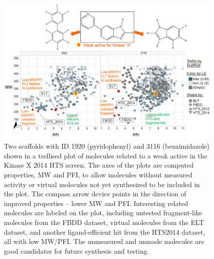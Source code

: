 \documentclass[journal=jacsat,biochem,manuscript=article]{achemso}
\begin{document}
\begin{figure}
\includegraphics[width=6in]{fig/KinaseX_ELT_v2.png}
\caption{
Two scaffolds with ID 1920 (pyridophenyl) and 3116 (benzimidazole) shown in a trellised plot of molecules related to a weak active in the Kinase X 2014 HTS screen. The axes of the plots are computed properties, MW and PFI, to allow molecules without measured activity or virtual molecules not yet synthesized to be included in the plot. The compass arrow device points in the direction of improved properties -- lower MW and PFI. Interesting related molecules are labeled on the plot, including untested fragment-like molecules from the FBDD dataset, virtual molecules from the ELT dataset, and another ligand-efficient hit from the HTS2014 dataset, all with low MW/PFI. The unmeasured and unmade molecules are good candidates for future synthesis and testing.   
}
\label{fig:ELT}   
\end{figure}
\end{document}
